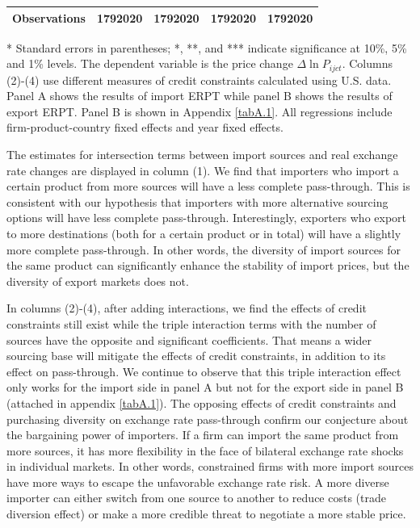 \documentclass[12pt]{article}
\begin{document}
\begin{table}[htbp]
\begin{threeparttable}
\begin{tabular}{lcccc}
		Observations & 1792020 & 1792020 & 1792020 & 1792020 \\
		\bottomrule
	\end{tabular}
	\begin{tablenotes}
	\footnotesize
	\item[*] Standard errors in parentheses; *, **, and *** indicate significance at 10\%, 5\% and 1\% levels. The dependent variable is the price change $\Delta \ln P_{ijct}$. Columns (2)-(4) use different measures of credit constraints calculated using U.S. data. Panel A shows the results of import ERPT while panel B shows the results of export ERPT. Panel B is shown in Appendix \ref{tabA.1}. All regressions include firm-product-country fixed effects and year fixed effects.
	\end{tablenotes}
	\end{threeparttable}
	\label{tab.source}
\end{table}

The estimates for intersection terms between import sources and real exchange rate changes are displayed in column (1). We find that importers who import a certain product from more sources will have a less complete pass-through. This is consistent with our hypothesis that importers with more alternative sourcing options will have less complete pass-through. Interestingly, exporters who export to more destinations (both for a certain product or in total) will have a slightly more complete pass-through. In other words, the diversity of import sources for the same product can significantly enhance the stability of import prices, but the diversity of export markets does not.

In columns (2)-(4), after adding interactions, we find the effects of credit constraints still exist while the triple interaction terms with the number of sources have the opposite and significant coefficients. That means a wider sourcing base will mitigate the effects of credit constraints, in addition to its effect on pass-through. We continue to observe that this triple interaction effect only works for the import side in panel A but not for the export side in panel B (attached in appendix \ref{tabA.1}). The opposing effects of credit constraints and purchasing diversity on exchange rate pass-through confirm our conjecture about the bargaining power of importers. If a firm can import the same product from more sources, it has more flexibility in the face of bilateral exchange rate shocks in individual markets. In other words, constrained firms with more import sources have more ways to escape the unfavorable exchange rate risk. A more diverse importer can either switch from one source to another to reduce costs (trade diversion effect) or make a more credible threat to negotiate a more stable price. 
\end{document}
